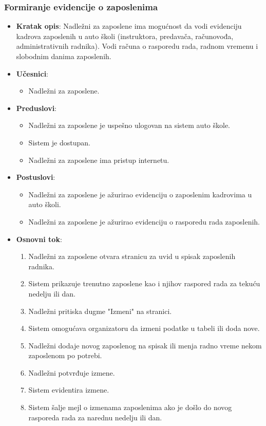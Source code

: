 \subsubsection{Formiranje evidencije o zaposlenima}
\label{subsubsec:vozni park}
\begin{itemize}
  \item \textbf{Kratak opis}: Nadležni za zaposlene ima mogućnost da vodi evidenciju kadrova zaposlenih u auto školi 
  (instruktora, predavača, računovođa, administrativnih radnika). Vodi računa o rasporedu rada, radnom vremenu i slobodnim danima zaposlenih.

  \item \textbf{Učesnici}:
    \begin{itemize}
    \item Nadležni za zaposlene.
    \end{itemize}
  \item \textbf{Preduslovi}:
    \begin{itemize}
    \item  Nadležni za zaposlene je uspešno ulogovan na sistem auto škole.
    \item  Sistem je dostupan.
    \item  Nadležni za zaposlene ima pristup internetu.
    \end{itemize}
  \item \textbf{Postuslovi}:
      \begin{itemize}
      \item  Nadležni za zaposlene je ažurirao evidenciju o zaposlenim kadrovima u auto školi.
      \item  Nadležni za zaposlene je ažurirao evidenciju o rasporedu rada zaposlenih.
      \end{itemize}
  \item \textbf{Osnovni tok}:
      \begin{enumerate}
        \item Nadležni za zaposlene otvara stranicu za uvid u spisak zaposlenih radnika.
        \item Sistem prikazuje trenutno zaposlene kao i njihov raspored rada za tekuću nedelju ili dan.
        \item Nadležni pritiska dugme "Izmeni" na stranici.
        \item Sistem omogućava organizatoru da izmeni podatke u tabeli ili doda nove.
        \item Nadležni dodaje novog zaposlenog na spisak ili menja radno vreme nekom zaposlenom po potrebi.
        \item Nadležni potvrđuje izmene.
        \item Sistem evidentira izmene.
        \item Sistem šalje mejl o izmenama zaposlenima ako je došlo do novog rasporeda rada za narednu nedelju ili dan.
      \end{enumerate}


\end{itemize}
